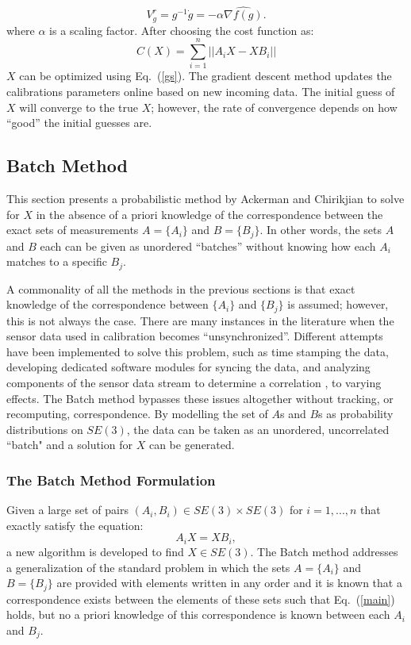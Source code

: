 \documentclass[twocolumn,10pt]{asme2ej}
\begin{document}
\begin{equation}
V^{r}_{g} = g^{-1}\dot{g} = -\alpha \widehat{\nabla f(g)}.
\label{gs}
\end{equation} 
where $\alpha$ is a scaling factor.
After choosing the cost function as:
\begin{equation}
C(X) = \sum_{i=1}^{n}||A_{i}X - XB_{i}||
\end{equation}
$X$ can be optimized using Eq.~(\ref{gs}).
The gradient descent method updates the calibrations parameters online based on new incoming data. The initial guess of $X$ will converge to the true $X$; however, the rate of convergence depends on how ``good'' the initial guesses are.


\subsection{Batch Method}
\label{batchnoisefree}
This section presents a probabilistic method \cite{ackermanGSI} by Ackerman and Chirikjian to solve for $X$ in the absence of %
a priori knowledge of the correspondence between the exact sets of measurements
$A = \{A_i\}$ and $B = \{B_j\}$. In other words, the sets $A$ and $B$ each can be given as unordered ``batches'' without knowing how each $A_i$ matches to a specific $B_j$.

A commonality of all the methods in the previous sections is that exact knowledge of the correspondence between $\{A_i\}$ and $\{B_j\}$ is assumed; however, this is not always the case. There are many instances in the literature when the sensor data used in calibration becomes ``unsynchronized''. Different attempts have been implemented to solve this problem, such as time stamping the data, developing dedicated software modules for syncing the data, and analyzing components of the sensor data stream to determine a correlation \cite{darius1}, to varying effects. The Batch method bypasses these issues altogether without tracking, or recomputing, correspondence. By modelling the set of $A$s and $B$s as probability distributions on $SE(3)$, the data can be taken as an unordered, uncorrelated ``batch" and a solution for $X$ can be generated.

\subsubsection{The Batch Method Formulation}
Given a large set of pairs $(A_i,B_i) \in SE(3) \times SE(3)$ for $i =1,...,n$ that exactly satisfy the equation:
\begin{equation} A_i X = X B_i , \label{main} \end{equation}
a new algorithm is developed to find $X \in SE(3)$. The Batch method addresses a generalization of the standard problem in which
the sets $A=\{A_i\}$ and $B =\{B_j\}$ are provided with elements written in any order and it is known that a correspondence exists between the elements of these sets such that Eq.~(\ref{main}) holds, but no a priori knowledge of this correspondence is known between each $A_i$ and $B_j$.
\end{document}
